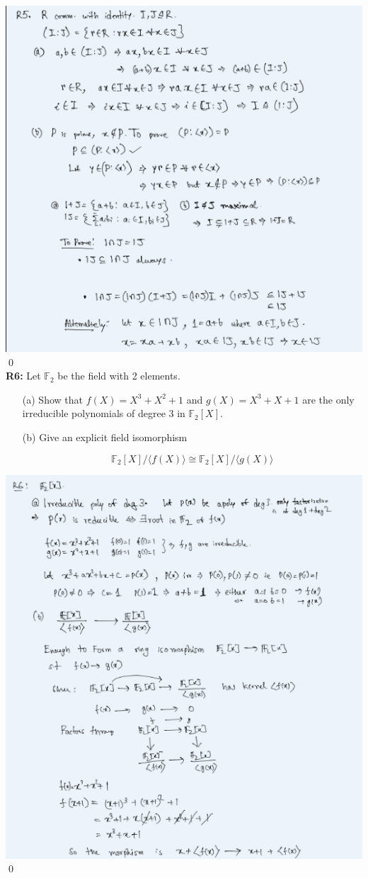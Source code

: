 \includegraphics{R2.5.png}
\qed\\
\textbf{R6:} Let $\mathbb{F}_{2}$ be the field with 2 elements.
\begin{itemize}
	\item[(a)] Show that $f(X)=X^{3}+X^{2}+1$ and $g(X)=X^{3}+X+1$ are the only irreducible polynomials of degree 3 in $\mathbb{F}_{2}[X]$.
	\item[(b)] Give an explicit field isomorphism

$$
\mathbb{F}_{2}[X] /\langle f(X)\rangle \cong \mathbb{F}_{2}[X] /\langle g(X)\rangle
$$
\end{itemize}
\soln
\includegraphics{R2.6.png}
\qed\\ 

